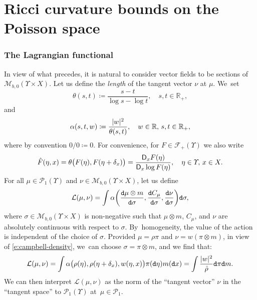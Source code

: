 \documentclass[JEP,XML,SOM,Unicode,published]{cedram}
\newcommand{\real}{\mathbb{R}}
\theoremstyle{definition}
\theoremstyle{remark}
\DeclarePairedDelimiter{\paren}{\lparen}{\rparen}
\DeclarePairedDelimiter{\abs}{\lvert}{\rvert}
\begin{document}
\section{Ricci curvature bounds on the Poisson space}

\label{s:variational-distance}
\subsubsection{The Lagrangian functional}
In view of what precedes, it is natural to consider vector fields to be sections of $\mathscr{M}_{b,0}(\varUpsilon \times X)$.
Let us define the \emph{length} of the tangent vector $\nu$ at $\mu$. We~set
\begin{equation*}
\theta(s,t) \coloneq \frac{s-t}{\log s - \log t}, \quad s,t \in \real_{+},
\end{equation*}
and
\begin{equation*}
\alpha(s,t,w) \coloneq \frac{\abs{w}^{2}}{\theta(s,t)}, \quad w \in \real,\, s,t \in \real_{+},
\end{equation*}
where by convention $0/0 \coloneq 0$.
For convenience, for $F \in \mathscr{F}_{+}(\varUpsilon)$ we also write
\begin{equation*}
\hat{F}(\eta, x) = \theta\paren[\big]{F(\eta), F(\eta + \delta_{x})} = \frac{\mathsf{D}_{x} F(\eta)}{\mathsf{D}_{x} \log F(\eta)}, \quad \eta \in \varUpsilon,\, x \in X.
\end{equation*}
For all $\mu \in \mathscr{P}_{1}(\varUpsilon)$ and $\nu \in \mathscr{M}_{b,0}(\varUpsilon \times X)$, let us define
\begin{equation*}
\mathcal{L}(\mu, \nu) = \int \alpha\paren*{\frac{\mathtt{d} \mu \otimes m}{\mathtt{d} \sigma}, \frac{\mathtt{d} C_{\mu}}{\mathtt{d} \sigma}, \frac{\mathtt{d} \nu}{\mathtt{d} \sigma}} \mathtt{d} \sigma,
\end{equation*}
where $\sigma \in \mathscr{M}_{b,0}(\varUpsilon \times X)$ is non-negative such that $\mu \otimes m$, $C_{\mu}$, and $\nu$ are absolutely continuous with respect to $\sigma$.
By~homogeneity, the value of the action is independent of the choice of $\sigma$.
Provided $\mu = \rho \pi$ and $\nu = w (\pi \otimes m)$, in view of \cref{e:campbell-density}, we~can choose $\sigma = \pi \otimes m$, and we find that:
\begin{equation*}
\mathcal{L}(\mu, \nu) = \int \alpha\big(\rho(\eta), \rho(\eta + \delta_{x}),w(\eta, x)\big) \pi(\mathtt{d} \eta) m(\mathtt{d} x) = \int \frac{\abs{w}^{2}}{\hat{\rho}} \mathtt{d} \pi \mathtt{d} m.
\end{equation*}
We can then interpret $\mathcal{L}(\mu, \nu)$ as the norm of the \enquote{tangent vector} $\nu$ in the \enquote{tangent space} to $\mathscr{P}_1(\varUpsilon)$ at~$\mu\in\mathscr{P}_1$.
\end{document}
